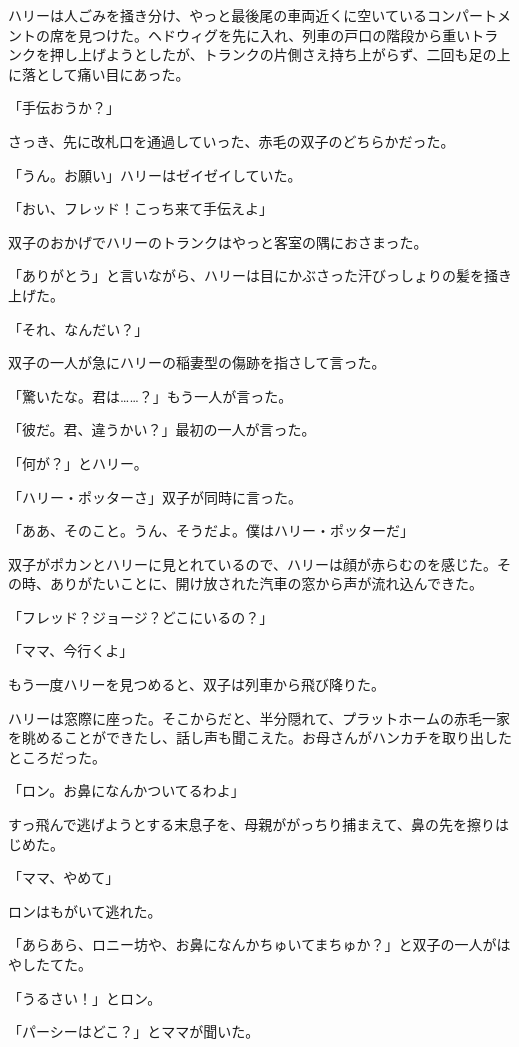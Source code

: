 \documentclass[10pt,a4paper]{article}
\begin{document}
\begin{CJK}{UTF8}{min}
ハリーは人ごみを掻き分け、やっと最後尾の車両近くに空いているコンパートメントの席を見つけた。ヘドウィグを先に入れ、列車の戸口の階段から重いトランクを押し上げようとしたが、トランクの片側さえ持ち上がらず、二回も足の上に落として痛い目にあった。

「手伝おうか？」

さっき、先に改札口を通過していった、赤毛の双子のどちらかだった。

「うん。お願い」ハリーはゼイゼイしていた。

「おい、フレッド！こっち来て手伝えよ」

双子のおかげでハリーのトランクはやっと客室の隅におさまった。

「ありがとう」と言いながら、ハリーは目にかぶさった汗びっしょりの髪を掻き上げた。

「それ、なんだい？」

双子の一人が急にハリーの稲妻型の傷跡を指さして言った。

「驚いたな。君は……？」もう一人が言った。

「彼だ。君、違うかい？」最初の一人が言った。

「何が？」とハリー。

「ハリー・ポッターさ」双子が同時に言った。

「ああ、そのこと。うん、そうだよ。僕はハリー・ポッターだ」

双子がポカンとハリーに見とれているので、ハリーは顔が赤らむのを感じた。その時、ありがたいことに、開け放された汽車の窓から声が流れ込んできた。

「フレッド？ジョージ？どこにいるの？」

「ママ、今行くよ」

もう一度ハリーを見つめると、双子は列車から飛び降りた。

ハリーは窓際に座った。そこからだと、半分隠れて、プラットホームの赤毛一家を眺めることができたし、話し声も聞こえた。お母さんがハンカチを取り出したところだった。

「ロン。お鼻になんかついてるわよ」

すっ飛んで逃げようとする末息子を、母親ががっちり捕まえて、鼻の先を擦りはじめた。

「ママ、やめて」

ロンはもがいて逃れた。

「あらあら、ロニー坊や、お鼻になんかちゅいてまちゅか？」と双子の一人がはやしたてた。

「うるさい！」とロン。

「パーシーはどこ？」とママが聞いた。


\end{CJK}
\end{document}
